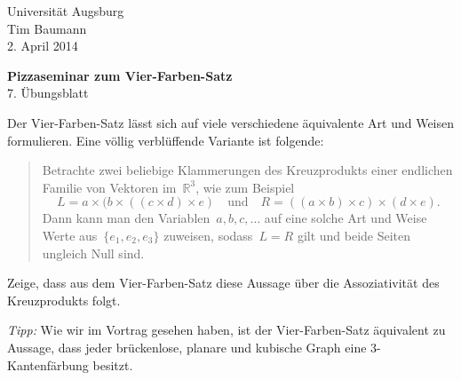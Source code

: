 \documentclass[a4paper,ngerman]{scrartcl}
\theoremstyle{definition}
\theoremstyle{plain}
\theoremstyle{remark}
\begin{document}
\vspace*{-4em}
\begin{flushright}Universität Augsburg \\ Tim Baumann \\ 2. April 2014\end{flushright}

\begin{center}\Large \textbf{Pizzaseminar zum Vier-Farben-Satz} \\
7. Übungsblatt
\end{center}
\vspace{1.5em}

Der Vier-Farben-Satz lässt sich auf viele verschiedene äquivalente Art und
Weisen formulieren. Eine völlig verblüffende Variante ist folgende:
\begin{quote}
Betrachte zwei beliebige Klammerungen des Kreuzprodukts einer
endlichen Familie von Vektoren im~$\mathbb{R}^3$, wie zum Beispiel
\[ L = a \times (b \times ((c \times d) \times e) \quad\text{und}\quad
R = ((a \times b) \times c) \times (d \times e). \]
Dann kann man den Variablen~$a,b,c,\ldots$ auf eine solche Art und Weise
Werte aus~$\{ e_1, e_2, e_3 \}$ zuweisen, sodass~$L = R$ gilt und beide Seiten
ungleich Null sind.
\end{quote}

Zeige, dass aus dem Vier-Farben-Satz diese Aussage über die Assoziativität des
Kreuzprodukts folgt.

\emph{Tipp:} Wie wir im Vortrag gesehen haben, ist der Vier-Farben-Satz
äquivalent zu Aussage, dass jeder brückenlose, planare und kubische
Graph eine 3-Kantenfärbung besitzt.
\end{document}
